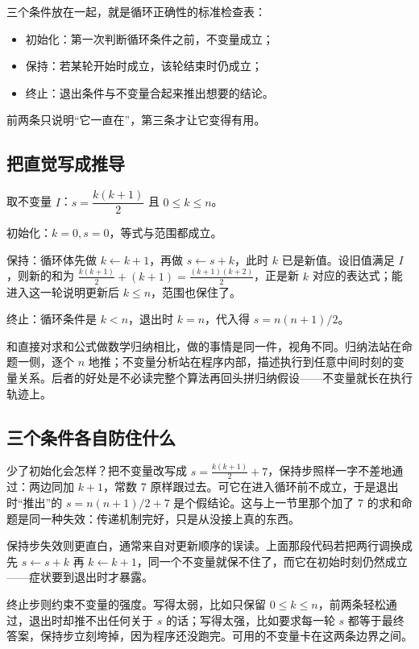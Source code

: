 三个条件放在一起，就是循环正确性的标准检查表：

\begin{itemize}
\tightlist
\item 初始化：第一次判断循环条件之前，不变量成立；
\item 保持：若某轮开始时成立，该轮结束时仍成立；
\item 终止：退出条件与不变量合起来推出想要的结论。
\end{itemize}

前两条只说明``它一直在''，第三条才让它变得有用。

\subsection{把直觉写成推导}

取不变量 \(I\)：\(s=\dfrac{k(k+1)}{2}\) 且 \(0\le k\le n\)。

初始化：\(k=0,s=0\)，等式与范围都成立。

保持：循环体先做 \(k\leftarrow k+1\)，再做 \(s\leftarrow s+k\)，此时 \(k\) 已是新值。设旧值满足 \(I\)，则新的和为 \(\frac{k(k+1)}{2}+(k+1)=\frac{(k+1)(k+2)}{2}\)，正是新 \(k\) 对应的表达式；能进入这一轮说明更新后 \(k\le n\)，范围也保住了。

终止：循环条件是 \(k<n\)，退出时 \(k=n\)，代入得 \(s=n(n+1)/2\)。

和直接对求和公式做数学归纳相比，做的事情是同一件，视角不同。归纳法站在命题一侧，逐个 \(n\) 地推；不变量分析站在程序内部，描述执行到任意中间时刻的变量关系。后者的好处是不必读完整个算法再回头拼归纳假设——不变量就长在执行轨迹上。

\subsection{三个条件各自防住什么}

少了初始化会怎样？把不变量改写成 \(s=\frac{k(k+1)}{2}+7\)，保持步照样一字不差地通过：两边同加 \(k+1\)，常数 7 原样跟过去。可它在进入循环前不成立，于是退出时``推出''的 \(s=n(n+1)/2+7\) 是个假结论。这与上一节里那个加了 7 的求和命题是同一种失效：传递机制完好，只是从没接上真的东西。

保持步失效则更直白，通常来自对更新顺序的误读。上面那段代码若把两行调换成先 \(s\leftarrow s+k\) 再 \(k\leftarrow k+1\)，同一个不变量就保不住了，而它在初始时刻仍然成立——症状要到退出时才暴露。

终止步则约束不变量的强度。写得太弱，比如只保留 \(0\le k\le n\)，前两条轻松通过，退出时却推不出任何关于 \(s\) 的话；写得太强，比如要求每一轮 \(s\) 都等于最终答案，保持步立刻垮掉，因为程序还没跑完。可用的不变量卡在这两条边界之间。

